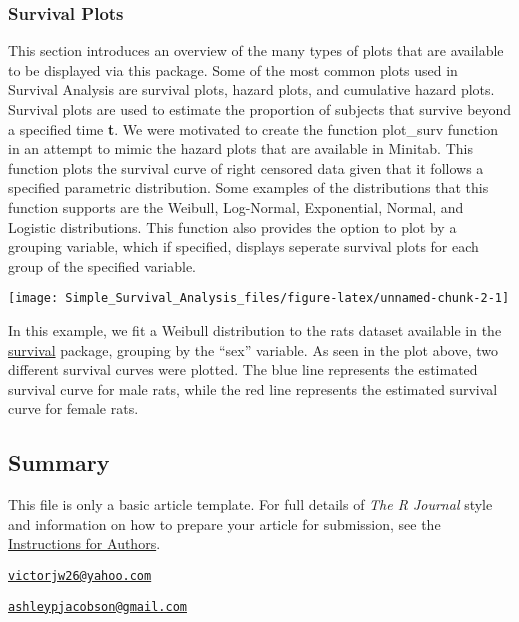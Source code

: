 \hypertarget{survival-plots}{%
\subsubsection{Survival Plots}\label{survival-plots}}

This section introduces an overview of the many types of plots that are
available to be displayed via this package. Some of the most common
plots used in Survival Analysis are survival plots, hazard plots, and
cumulative hazard plots. Survival plots are used to estimate the
proportion of subjects that survive beyond a specified time \textbf{t}.
We were motivated to create the function plot\_surv function in an
attempt to mimic the hazard plots that are available in Minitab. This
function plots the survival curve of right censored data given that it
follows a specified parametric distribution. Some examples of the
distributions that this function supports are the Weibull, Log-Normal,
Exponential, Normal, and Logistic distributions. This function also
provides the option to plot by a grouping variable, which if specified,
displays seperate survival plots for each group of the specified
variable.

\begin{Schunk}

\texttt{[image: Simple\_Survival\_Analysis\_files/figure-latex/unnamed-chunk-2-1]} \end{Schunk}

In this example, we fit a Weibull distribution to the rats dataset
available in the
\href{https://cran.r-project.org/web/packages/survival/index.html}{survival}
package, grouping by the ``sex'' variable. As seen in the plot above,
two different survival curves were plotted. The blue line represents the
estimated survival curve for male rats, while the red line represents
the estimated survival curve for female rats.

\hypertarget{summary}{%
\subsection{Summary}\label{summary}}

This file is only a basic article template. For full details of
\emph{The R Journal} style and information on how to prepare your
article for submission, see the
\href{https://journal.r-project.org/share/author-guide.pdf}{Instructions
for Authors}.




\address{%
Victor Wilson\\
California Polytechnic State University, San Luis Obispo - Statistics
Department\\
\\
}
\href{mailto:victorjw26@yahoo.com}{\nolinkurl{victorjw26@yahoo.com}}

\address{%
Ashley Jacobson\\
California Polytechnic State University, San Luis Obispo - Statistics
Department\\
\\
}
\href{mailto:ashleypjacobson@gmail.com}{\nolinkurl{ashleypjacobson@gmail.com}}

